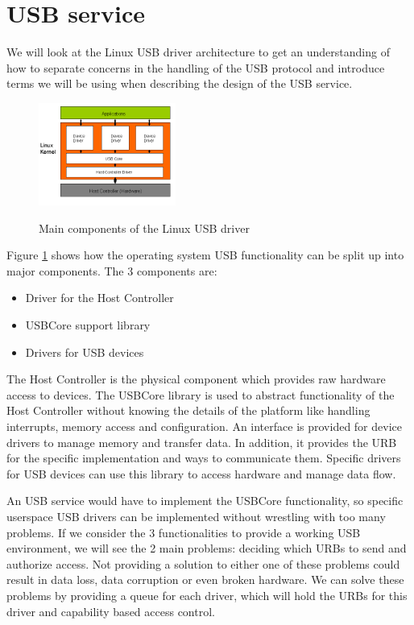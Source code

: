 \documentclass{acm_proc_article-sp}
\begin{document}
\section{USB service}
\label{sec:serv}
We will look at the Linux USB driver architecture to get an understanding of how to separate concerns
in the handling of the USB protocol and introduce terms we will be using when describing the design
of the USB service.
\begin{figure}[!h]
\centering
\includegraphics[width=0.4\textwidth]{usblinux.png}
\label{fig:usblinux}
\caption{Main components of the Linux USB driver}
\end{figure}
Figure \ref{fig:usblinux} shows how the operating system USB functionality can be split up into
major components.
The 3 components are:
\begin{itemize}
\item Driver for the Host Controller
\item USBCore support library
\item Drivers for USB devices
\end{itemize}
The Host Controller is the physical component which provides raw hardware access to devices.
The USBCore library is used to abstract functionality of the Host Controller without knowing
the details of the platform like handling interrupts, memory access and configuration.
An interface is provided for device drivers to manage memory and transfer data.
In addition, it provides the URB for the specific implementation and ways to communicate them.
Specific drivers for USB devices can use this library to access hardware and manage data flow.

An USB service would have to implement the USBCore functionality, so specific userspace
USB drivers can be implemented without wrestling with too many problems.
If we consider the 3 functionalities to provide a working USB environment, we will see the 2
main problems: deciding which URBs to send and authorize access.
Not providing a solution to either one of these problems could result in data loss,
data corruption or even broken hardware.
We can solve these problems by providing a queue for each driver, which will hold the URBs
for this driver and capability based access control.
\end{document}
